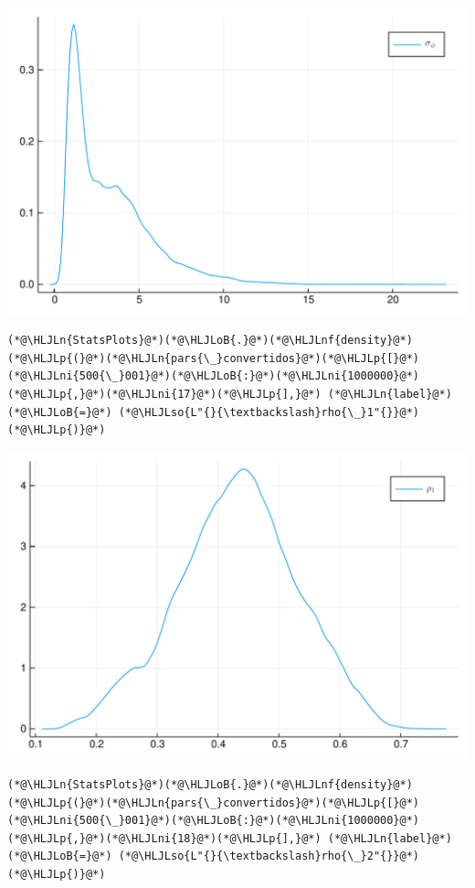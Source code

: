 \documentclass[12pt,a4paper]{article}
\newcommand{\HLJLn}[1]{#1}
\newcommand{\HLJLnf}[1]{\textcolor[RGB]{66,102,213}{#1}}
\newcommand{\HLJLso}[1]{\textcolor[RGB]{201,61,57}{#1}}
\newcommand{\HLJLni}[1]{\textcolor[RGB]{59,151,46}{#1}}
\newcommand{\HLJLoB}[1]{\textcolor[RGB]{102,102,102}{\textbf{#1}}}
\newcommand{\HLJLp}[1]{#1}
\begin{document}
\includegraphics[width=\linewidth]{figures/carlos_mcmc_17_1.pdf}

\begin{lstlisting}
(*@\HLJLn{StatsPlots}@*)(*@\HLJLoB{.}@*)(*@\HLJLnf{density}@*)(*@\HLJLp{(}@*)(*@\HLJLn{pars{\_}convertidos}@*)(*@\HLJLp{[}@*)(*@\HLJLni{500{\_}001}@*)(*@\HLJLoB{:}@*)(*@\HLJLni{1000000}@*)(*@\HLJLp{,}@*)(*@\HLJLni{17}@*)(*@\HLJLp{],}@*) (*@\HLJLn{label}@*)(*@\HLJLoB{=}@*) (*@\HLJLso{L"{}{\textbackslash}rho{\_}1"{}}@*)(*@\HLJLp{)}@*)
\end{lstlisting}

\includegraphics[width=\linewidth]{figures/carlos_mcmc_18_1.pdf}

\begin{lstlisting}
(*@\HLJLn{StatsPlots}@*)(*@\HLJLoB{.}@*)(*@\HLJLnf{density}@*)(*@\HLJLp{(}@*)(*@\HLJLn{pars{\_}convertidos}@*)(*@\HLJLp{[}@*)(*@\HLJLni{500{\_}001}@*)(*@\HLJLoB{:}@*)(*@\HLJLni{1000000}@*)(*@\HLJLp{,}@*)(*@\HLJLni{18}@*)(*@\HLJLp{],}@*) (*@\HLJLn{label}@*)(*@\HLJLoB{=}@*) (*@\HLJLso{L"{}{\textbackslash}rho{\_}2"{}}@*)(*@\HLJLp{)}@*)
\end{lstlisting}
\end{document}
